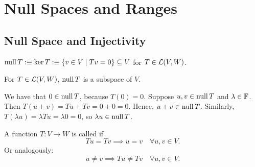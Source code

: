 \section{Null Spaces and Ranges}

\subsection{Null Space and Injectivity}

\begin{mydef} 
  $\operatorname{null} T :\equiv \ker T :\equiv \{ v \in V \mid Tv=0\} \subseteq V$ for $T \in {\mathcal{L}(V,W)}$.
\end{mydef}

\setcounter{thm}{12}
\begin{thm} 
  \label{thm: null space is a subspace}
  For $T\in\mathcal{L}(V, W)$, $\operatorname{null} T$ is a subspace of $V$.
\end{thm}
\begin{prf}
  We have that $0 \in \operatorname{null} T$, because $T(0) = 0$. Suppose $u,v \in \operatorname{null} T$ and $\lambda \in \mathbb{F}$. Then $T(u+v)=Tu+Tv=0+0=0$. Hence, $u+v \in \operatorname{null} T$. Similarly, $T(\lambda u)= \lambda Tu = \lambda 0 = 0$, so $\lambda u \in \operatorname{null} T$.
\end{prf}

\setcounter{thm}{13}
\begin{mydef} [injectivity]
  \label{def: injectivity}
  A function $T: V \to W$ is called  if
  \begin{equation}
    Tu = Tv \implies u = v \quad \forall u,v \in V.
  \end{equation}
  Or analogously:
  \begin{equation}
    u \neq v \implies Tu \neq Tv \quad \forall u,v \in V.
  \end{equation}
\end{mydef}


